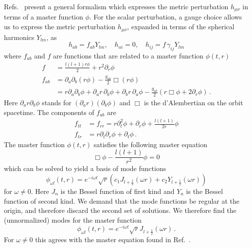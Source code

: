 \documentclass{brownthesis}
\begin{document}
Refs.~\cite{Kodama:2003jz,doi:10.1142/S0218271816410169} present
a general formalism which expresses the metric perturbation $h_{\mu\nu}$
in terms of a master function $\phi$. For the scalar perturbation,
a gauge choice allows us to express the metric perturbation $h_{\mu\nu}$,
expanded in terms of the spherical harmonics $Y_{lm}$, as
\begin{equation}
h_{ab}=f_{ab}Y_{lm},\quad h_{ai}=0,\quad h_{ij}=f\,\gamma_{ij}Y_{lm}\label{eq:ansatz}
\end{equation}
where $f_{ab}$ and $f$ are functions that are related to a master
function $\phi(t,r)$
\begin{align}
f & =\frac{l(l+1)r\phi}{2}+r^{2}\partial_{r}\phi\nonumber \\
f_{ab} & =\partial_{a}\partial_{b}(r\phi)-\frac{g_{ab}}{2}\Box(r\phi)\nonumber \\
 & =r\partial_{a}\partial_{b}\phi+\partial_{a}r\,\partial_{b}\phi+\partial_{b}r\,\partial_{a}\phi-\frac{g_{ab}}{2}(r\Box\phi+2\partial_{r}\phi)\,.\label{eq:fab}
\end{align}
Here $\partial_{a}r\partial_{b}\phi$ stands for $(\partial_{a}r)(\partial_{b}\phi)$
and $\Box$ is the d'Alembertian on the orbit spacetime. The components
of $f_{ab}$ are
\begin{align*}
f_{tt} & =f_{rr}=r\partial_{t}^{2}\phi+\partial_{r}\phi+\frac{l(l+1)}{2r}\phi\\
f_{tr} & =r\partial_{t}\partial_{r}\phi+\partial_{t}\phi\,.
\end{align*}
The master function $\phi(t,r)$ satisfies the following master equation
\[
\Box\phi-\frac{l(l+1)}{r^{2}}\phi=0
\]
which can be solved to yield a basis of mode functions
\[
\phi_{\omega l}(t,r)=e^{-i\omega t}\sqrt{r}(c_{1}J_{l+\frac{1}{2}}(\omega r)+c_{2}Y_{l+\frac{1}{2}}(\omega r))
\]
for $\omega\neq0$. Here $J_{n}$ is the Bessel function of first
kind and $Y_{n}$ is the Bessel function of second kind. We demand
that the mode functions be regular at the origin, and therefore discard
the second set of solutions. We therefore find the (unnormalized)
modes for the master function
\[
\phi_{\omega l}(t,r)=e^{-i\omega t}\sqrt{r}J_{l+\frac{1}{2}}(\omega r)\,.
\]
For $\omega\neq0$ this agrees with the master equation found in Ref.~\cite{PhysRevLett.24.737}.
\end{document}
